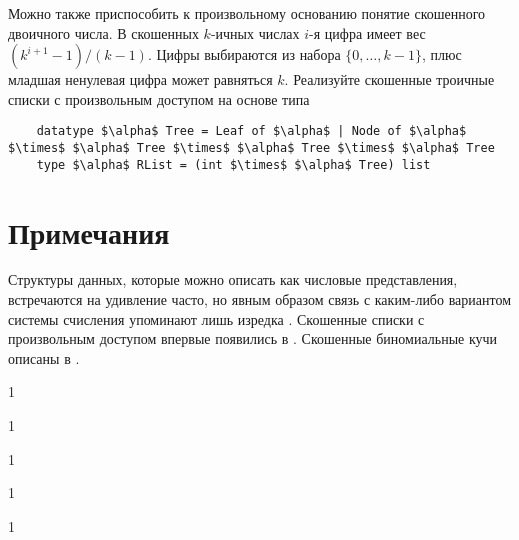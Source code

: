 \begin{frame}[fragile]{}
\begin{exercise}\label{ex:9.19}
  Можно также приспособить к произвольному основанию понятие
  скошенного двоичного числа. В скошенных $k$-ичных числах $i$-я цифра
  имеет вес $(k^{i+1} - 1) / (k - 1)$. Цифры выбираются из набора
  $\{0, \ldots, k-1\}$, плюс младшая ненулевая цифра может равняться
  $k$. Реализуйте скошенные троичные списки с произвольным доступом на
  основе типа
  \begin{lstlisting}
    datatype $\alpha$ Tree = Leaf of $\alpha$ | Node of $\alpha$ $\times$ $\alpha$ Tree $\times$ $\alpha$ Tree $\times$ $\alpha$ Tree
    type $\alpha$ RList = (int $\times$ $\alpha$ Tree) list
  \end{lstlisting}
\end{exercise}

\end{frame}

\section{Примечания}
\label{sc:9.5}

\begin{frame}[fragile]{}


Структуры данных, которые можно описать как числовые представления,
встречаются на удивление часто, но явным образом связь с
каким-либо вариантом системы счисления упоминают лишь изредка
\cite{Guibas-etal1977, Myers1983, CarlssonMunroPoblete1988,
  KaplanTarjan1996b}. Скошенные списки с произвольным доступом впервые
появились в \cite{Okasaki1996b}. Скошенные биномиальные кучи
описаны в \cite{BrodalOkasaki1996}.

\end{frame}


\begin{frame}[fragile]{}
1
\end{frame}

\begin{frame}[fragile]{}
1
\end{frame}

\begin{frame}[fragile]{}
1
\end{frame}

\begin{frame}[fragile]{}
1
\end{frame}

\begin{frame}[fragile]{}
1
\end{frame}

